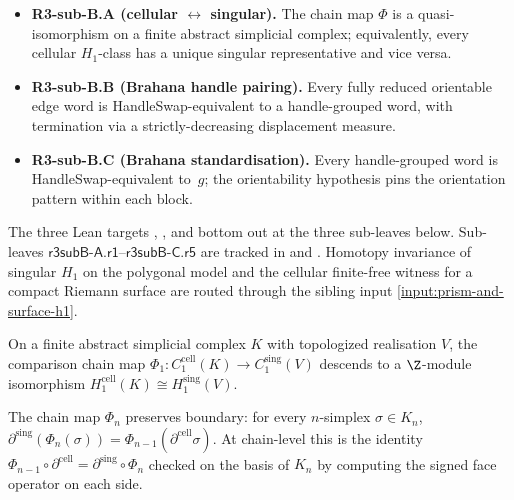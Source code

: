\begin{itemize}
\item \textbf{R3-sub-B.A (cellular \(\leftrightarrow\) singular).}
  The chain map \(\Phi\) is a quasi-isomorphism on a finite
  abstract simplicial complex; equivalently, every cellular
  \(H_{1}\)-class has a unique singular representative and vice versa.
\item \textbf{R3-sub-B.B (Brahana handle pairing).}  Every fully
  reduced orientable edge word is HandleSwap-equivalent to a
  handle-grouped word, with termination via a strictly-decreasing
  displacement measure.
\item \textbf{R3-sub-B.C (Brahana standardisation).}  Every
  handle-grouped word is HandleSwap-equivalent to
  \(\,g\); the orientability hypothesis pins
  the orientation pattern within each block.
\end{itemize}

\begin{theorem}
\label{input:stage-a-closeout}
The three Lean targets
, ,
and  bottom out
at the three sub-leaves below.  Sub-leaves
\(\textsf{r3subB-A.r1}\)--\(\textsf{r3subB-C.r5}\) are tracked in
 and
.  Homotopy invariance of
singular \(H_1\) on the polygonal model and the cellular finite-free
witness for a compact Riemann surface are routed through the
sibling input \ref{input:prism-and-surface-h1}.
\leanok
\end{theorem}

\begin{lemma}
\label{lem:r3subB-cellular-iso}
On a finite abstract simplicial complex \(K\) with topologized
realisation \(V\), the comparison chain map
\(\Phi_{1}:C^{\mathrm{cell}}_{1}(K)\to C^{\mathrm{sing}}_{1}(V)\)
descends to a \(\Z\)-module isomorphism
\(H_{1}^{\mathrm{cell}}(K)\cong H_{1}^{\mathrm{sing}}(V)\).
\leanok
\end{lemma}

\begin{lemma}
\label{lem:r3subB-A-r1}
The chain map \(\Phi_{n}\) preserves boundary: for every
\(n\)-simplex \(\sigma\in K_{n}\),
\(\partial^{\mathrm{sing}}(\Phi_{n}(\sigma))
=\Phi_{n-1}(\partial^{\mathrm{cell}}\sigma)\).
At chain-level this is the identity
\(\Phi_{n-1}\circ\partial^{\mathrm{cell}}=\partial^{\mathrm{sing}}\circ\Phi_{n}\)
checked on the basis of \(K_{n}\) by computing the signed face
operator on each side.
\leanok
\end{lemma}

